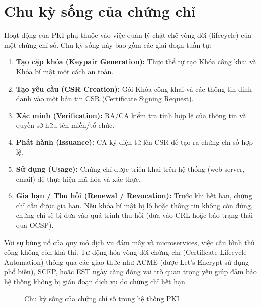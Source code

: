\section{Chu kỳ sống của chứng chỉ}
\label{sec:3.4}
Hoạt động của PKI phụ thuộc vào việc quản lý chặt chẽ vòng đời (lifecycle) của một chứng chỉ số. Chu kỳ sống này bao gồm các giai đoạn tuần tự:
\begin{enumerate}
    \item \textbf{Tạo cặp khóa (Keypair Generation):} Thực thể tự tạo Khóa công khai và Khóa bí mật một cách an toàn.
    \item \textbf{Tạo yêu cầu (CSR Creation):} Gói Khóa công khai và các thông tin định danh vào một bản tin CSR (Certificate Signing Request).
    \item \textbf{Xác minh (Verification):} RA/CA kiểm tra tính hợp lệ của thông tin và quyền sở hữu tên miền/tổ chức.
    \item \textbf{Phát hành (Issuance):} CA ký điện tử lên CSR để tạo ra chứng chỉ số hợp lệ.
    \item \textbf{Sử dụng (Usage):} Chứng chỉ được triển khai trên hệ thống (web server, email) để thực hiện mã hóa và xác thực.
    \item \textbf{Gia hạn / Thu hồi (Renewal / Revocation):} Trước khi hết hạn, chứng chỉ cần được gia hạn. Nếu khóa bí mật bị lộ hoặc thông tin không còn đúng, chứng chỉ sẽ bị đưa vào quá trình thu hồi (đưa vào CRL hoặc báo trạng thái qua OCSP).
\end{enumerate}

Với sự bùng nổ của quy mô dịch vụ đám mây và microservices, việc cấu hình thủ công không còn khả thi. Tự động hóa vòng đời chứng chỉ (Certificate Lifecycle Automation) thông qua các giao thức như ACME (được Let's Encrypt sử dụng phổ biến), SCEP, hoặc EST ngày càng đóng vai trò quan trọng yếu giúp đảm bảo hệ thống không bị gián đoạn dịch vụ do chứng chỉ hết hạn.

\begin{figure}[htbp]
    \centering
    \caption{Chu kỳ sống của chứng chỉ số trong hệ thống PKI}
    \label{fig:cert-lifecycle}
\end{figure}
